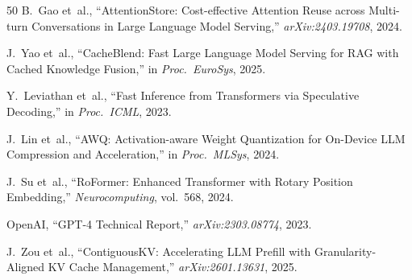 \documentclass[conference]{IEEEtran}
\begin{document}
\begin{thebibliography}{50}
 B.~Gao et~al., ``AttentionStore: Cost-effective Attention Reuse across Multi-turn Conversations in Large Language Model Serving,'' \textit{arXiv:2403.19708}, 2024.

 J.~Yao et~al., ``CacheBlend: Fast Large Language Model Serving for RAG with Cached Knowledge Fusion,'' in \textit{Proc.\ EuroSys}, 2025.

 Y.~Leviathan et~al., ``Fast Inference from Transformers via Speculative Decoding,'' in \textit{Proc.\ ICML}, 2023.

 J.~Lin et~al., ``AWQ: Activation-aware Weight Quantization for On-Device LLM Compression and Acceleration,'' in \textit{Proc.\ MLSys}, 2024.

 J.~Su et~al., ``RoFormer: Enhanced Transformer with Rotary Position Embedding,'' \textit{Neurocomputing}, vol.~568, 2024.

 OpenAI, ``GPT-4 Technical Report,'' \textit{arXiv:2303.08774}, 2023.

 J.~Zou et~al., ``ContiguousKV: Accelerating LLM Prefill with Granularity-Aligned KV Cache Management,'' \textit{arXiv:2601.13631}, 2025.

\end{thebibliography}
\end{document}
